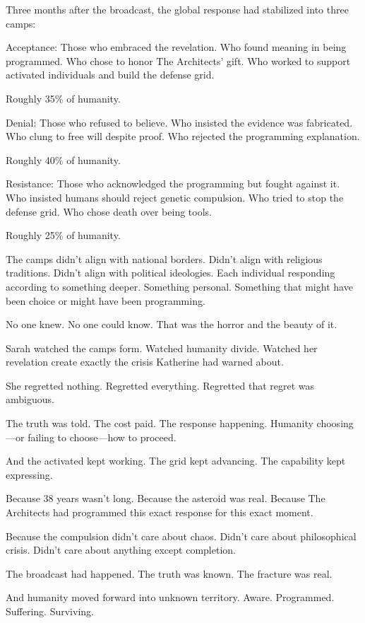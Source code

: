 Three months after the broadcast, the global response had stabilized into three camps:

Acceptance: Those who embraced the revelation. Who found meaning in being programmed. Who chose to honor The Architects' gift. Who worked to support activated individuals and build the defense grid.

Roughly 35\% of humanity.

Denial: Those who refused to believe. Who insisted the evidence was fabricated. Who clung to free will despite proof. Who rejected the programming explanation.

Roughly 40\% of humanity.

Resistance: Those who acknowledged the programming but fought against it. Who insisted humans should reject genetic compulsion. Who tried to stop the defense grid. Who chose death over being tools.

Roughly 25\% of humanity.

The camps didn't align with national borders. Didn't align with religious traditions. Didn't align with political ideologies. Each individual responding according to something deeper. Something personal. Something that might have been choice or might have been programming.

No one knew. No one could know. That was the horror and the beauty of it.

Sarah watched the camps form. Watched humanity divide. Watched her revelation create exactly the crisis Katherine had warned about.

She regretted nothing. Regretted everything. Regretted that regret was ambiguous.

The truth was told. The cost paid. The response happening. Humanity choosing—or failing to choose—how to proceed.

And the activated kept working. The grid kept advancing. The capability kept expressing.

Because 38 years wasn't long. Because the asteroid was real. Because The Architects had programmed this exact response for this exact moment.

Because the compulsion didn't care about chaos. Didn't care about philosophical crisis. Didn't care about anything except completion.

The broadcast had happened. The truth was known. The fracture was real.

And humanity moved forward into unknown territory. Aware. Programmed. Suffering. Surviving.

